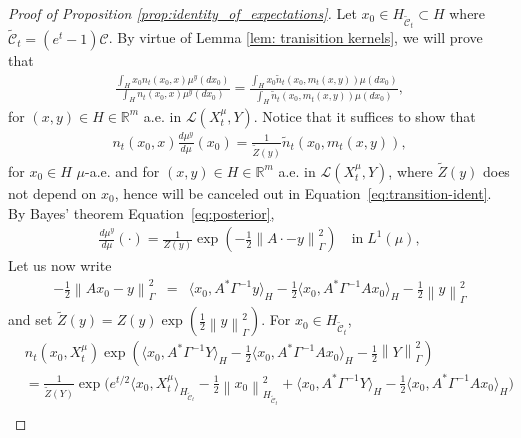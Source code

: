 \documentclass[10pt]{article} %
\def\Eqref#1{Equation~\ref{#1}}
\newcommand{\R}{\mathbb{R}}
\theoremstyle{plain}
\theoremstyle{definition}
\theoremstyle{remark}
\renewcommand{\L}{\mathscr{L}}
\newcommand{\norm}[1]{\left\|#1\right\|}
\newcommand{\C}{\mathcal C}
\begin{document}
\begin{proof}[Proof of Proposition \ref{prop:identity_of_expectations}]
    Let $x_0 \in H_{\widetilde{\C}_t} \subset H$ where $\widetilde{\C}_t = (e^t-1)\C$. By virtue of Lemma \ref{lem: tranisition kernels}, we will prove that
    \begin{eqnarray}\label{eq:transition-ident}
        \frac{\int_H x_0 n_t(x_0, x) \mu^y(dx_0)}{\int_H n_t(x_0, x) \mu^y(dx_0)} = \frac{\int_H x_0 \tilde n_t(x_0, m_t(x,y)) \mu(dx_0)}{\int_H \tilde n_t(x_0, m_t(x,y)) \mu(dx_0)},
    \end{eqnarray}
    for $(x,y) \in H \in \R^m$ a.e. in $\L(X_t^\mu, Y)$. 
    Notice that it suffices to show that %
    \begin{eqnarray} \label{eq:Bayes-identity}
        n_t(x_0, x) \frac{d \mu^y}{d \mu}(x_0)= \frac{1}{\widetilde{Z}(y)}\tilde{n}_t(x_0, m_t(x,y)),
    \end{eqnarray}
    for $x_0 \in H$ $\mu$-a.e. and for $(x,y) \in H \in \R^m$ a.e. in $\L(X_t^\mu, Y)$, where $\widetilde{Z}(y)$ does not depend on $x_0$, hence will be canceled out in \Eqref{eq:transition-ident}. 
    By Bayes' theorem \Eqref{eq:posterior},
    \begin{eqnarray*}
        \frac{d \mu^y}{d \mu}(\cdot) =  \frac{1}{Z(y)}\exp\left( -\frac{1}{2}\norm{A\cdot-y}^2_\Gamma \right) \quad \text{in}\; L^1(\mu),
    \end{eqnarray*}
    Let us now write
    \begin{eqnarray*}
         -\frac{1}{2} \norm{Ax_0-y}^2_\Gamma 
        & = &  \langle x_0, A^*\Gamma^{-1}y \rangle_H - \frac{1}{2}\langle x_0, A^*\Gamma^{-1}Ax_0 \rangle_H  -\frac{1}{2} \norm{y}_\Gamma^2
    \end{eqnarray*}
   and set $\widetilde{Z}(y) = Z(y)\exp{\left(\frac{1}{2} \norm{y}_\Gamma^2\right)}$. For $x_0 \in H_{\widetilde{\C}_t}$,
    \begin{equation}
    \begin{aligned}
    \label{eq:part-of-prop-proof}
    & n_t(x_0, X_t^\mu)  \exp\left(\langle x_0, A^*\Gamma^{-1}Y \rangle_H - \frac{1}{2}\langle x_0, A^*\Gamma^{-1}Ax_0 \rangle_H  -\frac{1}{2} \norm{Y}_\Gamma^2\right) \\
    &= \frac{1}{\widetilde{Z}(Y)} \exp\big( e^{t/2} \langle x_0, X_t^\mu \rangle_{H_{\widetilde{\C}_t}} - \frac{1}{2}\norm{x_0}_{H_{\widetilde{\C}_t}}^2 + \langle x_0, A^* \Gamma^{-1}Y \rangle_H - \frac{1}{2} \langle x_0, A^* \Gamma^{-1} A x_0 \rangle_H \big) \\

\end{aligned}
\end{equation}
\end{proof}
\end{document}
